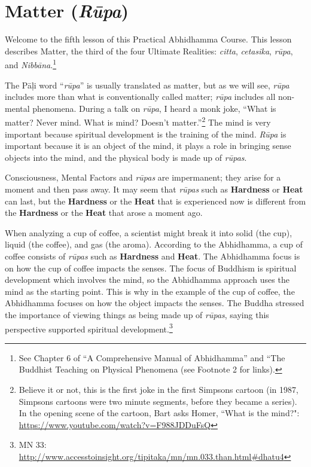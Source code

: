 \section{Matter (\textit{Rūpa})}

Welcome to the fifth lesson of this Practical Abhidhamma Course. This lesson describes Matter, the third of the four Ultimate Realities: \textit{citta}, \textit{cetasika}, \textit{rūpa}, and \textit{Nibbāna}.\footnote{See Chapter 6 of “A Comprehensive Manual of Abhidhamma” and “The Buddhist Teaching on Physical Phenomena (see Footnote 2 for links).}

The Pāḷi word “\textit{rūpa}” is usually translated as matter, but as we will see, \textit{rūpa} includes more than what is conventionally called matter; \textit{rūpa} includes all non-mental phenomena. During a talk on \textit{rūpa}, I heard a monk joke, “What is matter? Never mind. What is mind? Doesn’t matter.”\footnote{Believe it or not, this is the first joke in the first Simpsons cartoon (in 1987, Simpsons cartoons were two minute segments, before they became a series). In the opening scene of the cartoon, Bart asks Homer, ``What is the mind?": \url{https://www.youtube.com/watch?v=F988JDDuFsQ}} The mind is very important because spiritual development is the training of the mind. \textit{Rūpa} is important because it is an object of the mind, it plays a role in bringing sense objects into the mind, and the physical body is made up of \textit{rūpas}.

Consciousness, Mental Factors and \textit{rūpas} are impermanent; they arise for a moment and then pass away. It may seem that \textit{rūpas} such as \textbf{Hardness} or \textbf{Heat} can last, but the \textbf{Hardness} or the \textbf{Heat} that is experienced now is different from the \textbf{Hardness} or the \textbf{Heat} that arose a moment ago.

When analyzing a cup of coffee, a scientist might break it into solid (the cup), liquid (the coffee), and gas (the aroma). According to the Abhidhamma, a cup of coffee consists of \textit{rūpas} such as \textbf{Hardness} and \textbf{Heat}. The Abhidhamma focus is on how the cup of coffee impacts the senses. The focus of Buddhism is spiritual development which involves the mind, so the Abhidhamma approach uses the mind as the starting point. This is why in the example of the cup of coffee, the Abhidhamma focuses on how the object impacts the senses. The Buddha stressed the importance of viewing things as being made up of \textit{rūpas}, saying this perspective supported spiritual development.\footnote{MN 33: \url{http://www.accesstoinsight.org/tipitaka/mn/mn.033.than.html\#dhatu4}}

